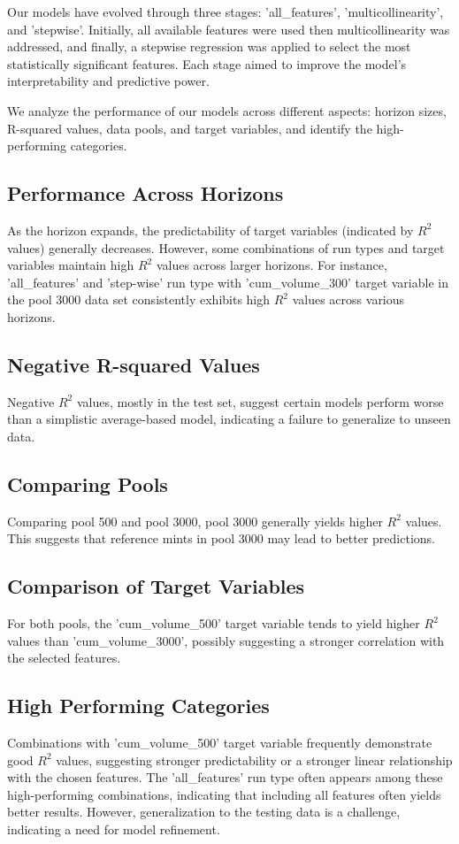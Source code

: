 \documentclass{article}
\begin{document}
Our models have evolved through three stages: 'all\_features', 'multicollinearity', and 'stepwise'. Initially, all available features were used then multicollinearity was addressed, and finally, a stepwise regression was applied to select the most statistically significant features. Each stage aimed to improve the model's interpretability and predictive power.

We analyze the performance of our models across different aspects: horizon sizes, R-squared values, data pools, and target variables, and identify the high-performing categories.

\subsection{Performance Across Horizons}
As the horizon expands, the predictability of target variables (indicated by \( R^2 \) values) generally decreases. However, some combinations of run types and target variables maintain high \( R^2 \) values across larger horizons. For instance, 'all\_features' and 'step-wise' run type with 'cum\_volume\_300' target variable in the pool 3000 data set consistently exhibits high \( R^2 \) values across various horizons.

\subsection{Negative R-squared Values}
Negative \( R^2 \) values, mostly in the test set, suggest certain models perform worse than a simplistic average-based model, indicating a failure to generalize to unseen data.

\subsection{Comparing Pools}
Comparing pool 500 and pool 3000, pool 3000 generally yields higher \( R^2 \) values. This suggests that reference mints in pool 3000 may lead to better predictions.

\subsection{Comparison of Target Variables}
For both pools, the 'cum\_volume\_500' target variable tends to yield higher \( R^2 \) values than 'cum\_volume\_3000', possibly suggesting a stronger correlation with the selected features.

\subsection{High Performing Categories}
Combinations with 'cum\_volume\_500' target variable frequently demonstrate good \( R^2 \) values, suggesting stronger predictability or a stronger linear relationship with the chosen features. The 'all\_features' run type often appears among these high-performing combinations, indicating that including all features often yields better results. However, generalization to the testing data is a challenge, indicating a need for model refinement. 
\end{document}

